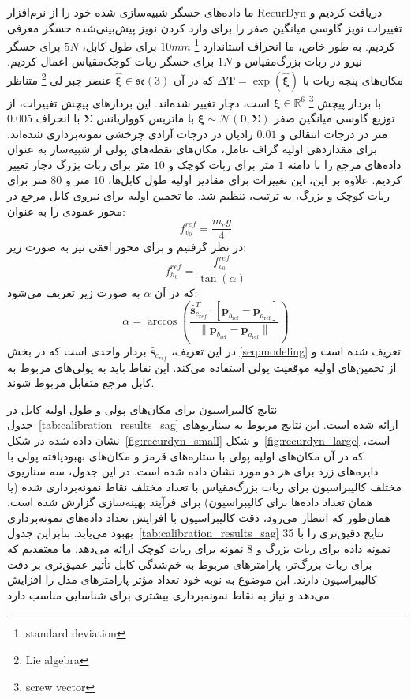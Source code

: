 ما داده‌های حسگر شبیه‌سازی شده خود را از نرم‌افزار RecurDyn دریافت کردیم و تغییرات نویز گاوسی میانگین صفر را برای وارد کردن نویز پیش‌بینی‌شده حسگر معرفی کردیم. به طور خاص، ما انحراف استاندارد
\footnote{standard deviation} 
$10mm$ 
برای طول کابل، $5N$ برای حسگر نیرو در ربات بزرگ‌مقیاس و $1N$ برای حسگر ربات کوچک‌مقیاس اعمال کردیم. مکان‌های پنجه ربات با $\Delta \mathbf{T} = \exp(\hat{\boldsymbol{\xi}})$ که در آن $\hat{\boldsymbol{\xi}} \in \mathfrak{se}(3)$ عنصر جبر لی
\footnote{Lie algebra}
 متناظر با بردار پیچش
\footnote{screw vector}
  $\boldsymbol{\xi} \in \mathbb{R}^6$
 است، دچار تغییر شده‌اند. این بردارهای پیچش تغییرات، از توزیع گاوسی میانگین صفر $\boldsymbol{\xi}\sim\mathcal{N}(\mathbf{0}, \boldsymbol{\Sigma})$ با ماتریس کوواریانس $\boldsymbol{\Sigma}$ با انحراف $0.005$ متر در درجات انتقالی و $0.01$ رادیان در درجات آزادی چرخشی نمونه‌برداری شده‌اند.
برای مقداردهی اولیه گراف عامل، مکان‌های نقطه‌های پولی از شبیه‌ساز به عنوان داده‌های مرجع را با دامنه $1$ متر برای ربات کوچک و $10$ متر برای  ربات بزرگ دچار تغییر کردیم. علاوه بر این، این تغییرات برای مقادیر اولیه طول کابل‌ها، $10$ متر و $80$ متر برای ربات کوچک و بزرگ، به ترتیب، تنظیم شد. ما تخمین اولیه برای نیروی کابل مرجع در محور عمودی را به عنوان:
\begin{equation}  \label{eq:fv_0}
	f^{{ref}}_{v_0} = \frac{m_eg}{4}
\end{equation}
  در نظر گرفتیم و برای محور افقی نیز به صورت زیر:
\begin{equation}  \label{eq:fh_0}
	f^{ref}_{h_0}=\frac{f^{{ref}}_{v_0}}{\tan(\alpha)} 
\end{equation}
که در آن $\alpha$ به صورت زیر تعریف می‌شود:
\begin{equation}  \label{eq:alpha}
	\alpha = \arccos\left(\frac{\hat{\bm{s}}_{c_{ref}}^T \cdot [\bm{p}_{b_{\text{ref}}} - \bm{p}_{a_{\text{ref}}}]}{\| \bm{p}_{b_{\text{ref}}} - \bm{p}_{a_{\text{ref}}} \|}\right)
\end{equation}
در این تعریف، $\hat{\bm{s}}_{c_{ref}}$ بردار واحدی است که در بخش \ref{seq:modeling} تعریف شده است و از تخمین‌های اولیه موقعیت پولی استفاده می‌کند. این نقاط باید به پولی‌های مربوط به کابل مرجع متقابل مربوط ‌شوند.

نتایج کالیبراسیون برای مکان‌های پولی و طول اولیه کابل در جدول~\ref{tab:calibration_results_sag} ارائه شده است. این نتایج مربوط به سناریوهای نشان داده شده در شکل~\ref{fig:recurdyn_small} و شکل~\ref{fig:recurdyn_large} است، که در آن مکان‌های اولیه پولی با ستاره‌های قرمز و مکان‌های بهبودیافته پولی‌ با دایره‌های زرد برای هر دو مورد نشان داده شده است.
در این جدول، سه سناریوی مختلف کالیبراسیون برای ربات بزرگ‌مقیاس با تعداد مختلف نقاط نمونه‌برداری شده (یا همان تعداد داده‌ها برای کالیبراسیون) برای فرآیند بهینه‌سازی گزارش شده است. همان‌طور که انتظار می‌رود، دقت کالیبراسیون با افزایش تعداد داده‌های نمونه‌برداری بهبود می‌یابد. بنابراین جدول~\ref{tab:calibration_results_sag} نتایج دقیق‌تری را با 35 نمونه داده برای ربات بزرگ و 8 نمونه برای ربات کوچک ارائه می‌دهد. ما معتقدیم که برای ربات بزرگ‌تر، پارامترهای مربوط به خم‌شدگی کابل تأثیر عمیق‌تری بر دقت کالیبراسیون دارند. این موضوع به نوبه خود تعداد مؤثر پارامترهای مدل را افزایش می‌دهد و نیاز به نقاط نمونه‌برداری بیشتری برای شناسایی مناسب دارد.

